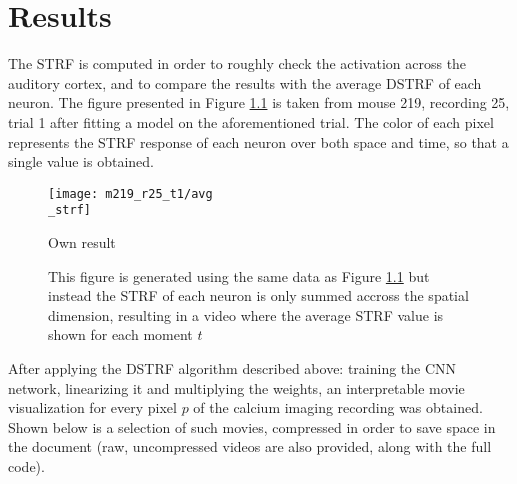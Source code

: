\chapter{Results}\label{results}

The STRF is computed in order to roughly check the activation across the auditory cortex, and to compare the results with the average DSTRF of each neuron. The figure presented in Figure \ref{fig:strf_m219_r25} is taken from mouse 219, recording 25, trial 1 after fitting a  model on the aforementioned trial. The color of each pixel represents the STRF response of each neuron over both space and time, so that a single value is obtained.

\begin{figure}[ht]
	\centering
	\texttt{[image: m219\_r25\_t1/avg\\\_strf]}
	\caption{Own result}
	\label{fig:strf_m219_r25}
\end{figure}

\begin{figure}
\centering
{}
\caption{This figure is generated using the same data as Figure \ref{fig:strf_m219_r25} but instead the STRF of each neuron is only summed accross the spatial dimension, resulting in a video where the average STRF value is shown for each moment $t$}
\end{figure}


After applying the DSTRF algorithm described above: training the CNN network, linearizing it and multiplying the weights, an interpretable movie visualization for every pixel $p$ of the calcium imaging recording was obtained. Shown below is a selection of such movies, compressed in order to save space in the document (raw, uncompressed videos are also provided, along with the full code).


\begin{figure}
	\centering
	
\end{figure}

